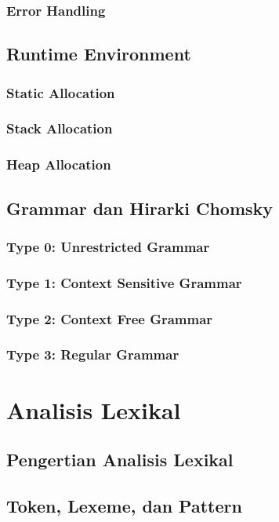 \documentclass{book}
\begin{document}
         \subsection{Error Handling}
    \section{Runtime Environment}
         \subsection{Static Allocation}
         \subsection{Stack Allocation}
         \subsection{Heap Allocation}
    \section{Grammar dan Hirarki Chomsky}
         \subsection{Type 0: Unrestricted Grammar}
         \subsection{Type 1: Context Sensitive Grammar}
         \subsection{Type 2: Context Free Grammar}
         \subsection{Type 3: Regular Grammar}
    
\chapter{Analisis Lexikal}
    \section{Pengertian Analisis Lexikal}
    \section{Token, Lexeme, dan Pattern}
\end{document}
